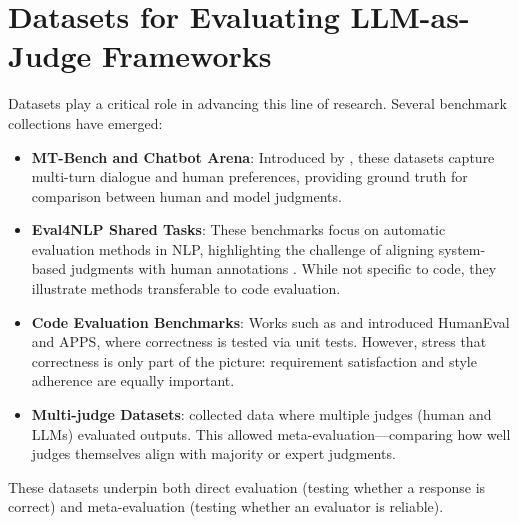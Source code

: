 \section{Datasets for Evaluating LLM-as-Judge Frameworks}
Datasets play a critical role in advancing this line of research. Several benchmark collections have emerged:

\begin{itemize}
    \item \textbf{MT-Bench and Chatbot Arena}: Introduced by \citet{zheng2023judgelm}, these datasets capture multi-turn dialogue and human preferences, providing ground truth for comparison between human and model judgments.
    \item \textbf{Eval4NLP Shared Tasks}: These benchmarks focus on automatic evaluation methods in NLP, highlighting the challenge of aligning system-based judgments with human annotations \citep{zeng2023llm}. While not specific to code, they illustrate methods transferable to code evaluation.
    \item \textbf{Code Evaluation Benchmarks}: Works such as \citet{chen2021evaluating} and \citet{hendrycks2021measuring} introduced HumanEval and APPS, where correctness is tested via unit tests. However, \citet{fu2023gptscore} stress that correctness is only part of the picture: requirement satisfaction and style adherence are equally important.
    \item \textbf{Multi-judge Datasets}: \citet{wang2023aligning} collected data where multiple judges (human and LLMs) evaluated outputs. This allowed meta-evaluation—comparing how well judges themselves align with majority or expert judgments.
\end{itemize}

These datasets underpin both direct evaluation (testing whether a response is correct) and meta-evaluation (testing whether an evaluator is reliable).